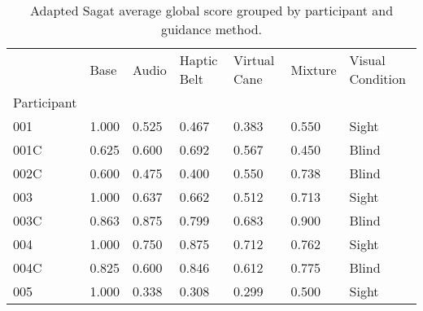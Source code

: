 
\begin{table}[!htb]
\centering
\caption{Adapted Sagat average global score grouped by participant and guidance method.}
\label{tab:sagat_average}
\begin{tabular}{lllllll}
\toprule
{} &  Base &  Audio &  Haptic Belt &  Virtual Cane &  Mixture & Visual Condition \\
Participant &       &        &              &               &          &                  \\
\midrule
001         & 1.000 &  0.525 &        0.467 &         0.383 &    0.550 &            Sight \\
001C        & 0.625 &  0.600 &        0.692 &         0.567 &    0.450 &            Blind \\
002C        & 0.600 &  0.475 &        0.400 &         0.550 &    0.738 &            Blind \\
003         & 1.000 &  0.637 &        0.662 &         0.512 &    0.713 &            Sight \\
003C        & 0.863 &  0.875 &        0.799 &         0.683 &    0.900 &            Blind \\
004         & 1.000 &  0.750 &        0.875 &         0.712 &    0.762 &            Sight \\
004C        & 0.825 &  0.600 &        0.846 &         0.612 &    0.775 &            Blind \\
005         & 1.000 &  0.338 &        0.308 &         0.299 &    0.500 &            Sight \\
\bottomrule
\end{tabular}
\end{table}

